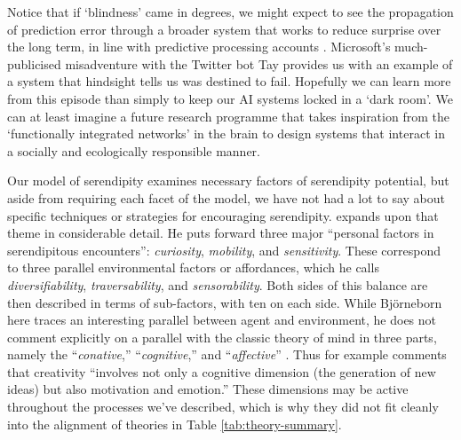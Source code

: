 Notice that if `blindness' came in degrees, we might expect to see the
propagation of prediction error through a broader system that works to
reduce surprise over the long term, in line with predictive processing
accounts \cite{Kiverstein2017,Friston2012}.  Microsoft's
much-publicised misadventure with the Twitter bot {\sf Tay}
\cite{wolf2017we} provides us with an example of a system that
hindsight tells us was destined to fail.  Hopefully we can learn more
from this episode than simply to keep our AI systems locked in a `dark
room'.  We can at least imagine a future research programme that takes
inspiration from the `functionally integrated networks' in the brain
\cite{Pessoa2017} to design systems that interact in a socially and
ecologically responsible manner.
 

Our model of serendipity examines necessary factors of serendipity
potential, but aside from requiring each facet of the model, we have
not had a lot to say about specific techniques or strategies for
encouraging serendipity.  \citet{bjorneborn2017three} expands upon
that theme in considerable detail.  He puts forward three major
``personal factors in serendipitous encounters'': \emph{curiosity},
\emph{mobility}, and \emph{sensitivity}.  These correspond to three
parallel environmental factors or affordances, which he calls
\emph{diversifiability}, \emph{traversability}, and
\emph{sensorability}.  Both sides of this balance are then described
in terms of sub-factors, with ten on each side.  While Bj\"orneborn
here traces an interesting parallel between agent and environment, he
does not comment explicitly on a parallel with the classic theory of
mind in three parts, namely the ``\emph{conative},''
``\emph{cognitive},'' and ``\emph{affective}''
\cite{hilgard1980trilogy}.
Thus for example \citet[p.~347]{boden1998creativity} comments that
creativity ``involves not only a cognitive dimension (the generation
of new ideas) but also motivation and emotion.''
These dimensions may be active throughout the processes we've
described, which is why they did not fit cleanly into the alignment of
theories in Table \ref{tab:theory-summary}.

